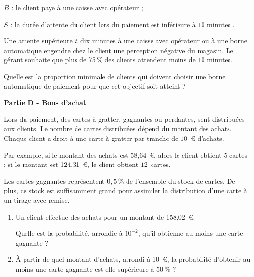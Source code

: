 \documentclass{cornouaille}
\begin{document}
\begin{exercice}
\begin{enumerate}
$\overline{B}$ : \og le client paye à une caisse avec opérateur \fg{} ;

$S$ : \og la durée d'attente du client lors du paiement est inférieure à $10$ minutes \fg.

Une attente supérieure à dix minutes à une caisse avec opérateur ou à une borne automatique
engendre chez le client une perception négative du magasin. Le gérant souhaite que
plus de 75\,\% des clients attendent moins de $10$ minutes.

Quelle est la proportion minimale de clients qui doivent choisir une borne automatique de
paiement pour que cet objectif soit atteint ?
 \end{enumerate}
 
\bigskip

\textbf{Partie D - Bons d'achat}

\medskip

Lors du paiement, des cartes à gratter, gagnantes ou perdantes, sont distribuées aux clients. Le
nombre de cartes distribuées dépend du montant des achats. Chaque client a droit à une carte à
gratter par tranche de $10$~\euro{} d'achats.

Par exemple, si le montant des achats est 58,64~\euro, alors le client obtient $5$ cartes ; si le montant est
124,31~\euro, le client obtient $12$~cartes.

Les cartes gagnantes représentent $0,5$\,\% de l'ensemble du stock de cartes. De plus, ce stock est
suffisamment grand pour assimiler la distribution d'une carte à un tirage avec remise.

\medskip

\begin{enumerate}
\item Un client effectue des achats pour un montant de 158,02~\euro.

Quelle est la probabilité, arrondie à $10^{-2}$, qu'il obtienne au moins une carte gagnante ?
\item  À partir de quel montant d'achats, arrondi à 10~\euro, la probabilité d'obtenir au moins une carte
gagnante est-elle supérieure à 50\,\% ?
\end{enumerate}
\end{exercice}
\end{document}
